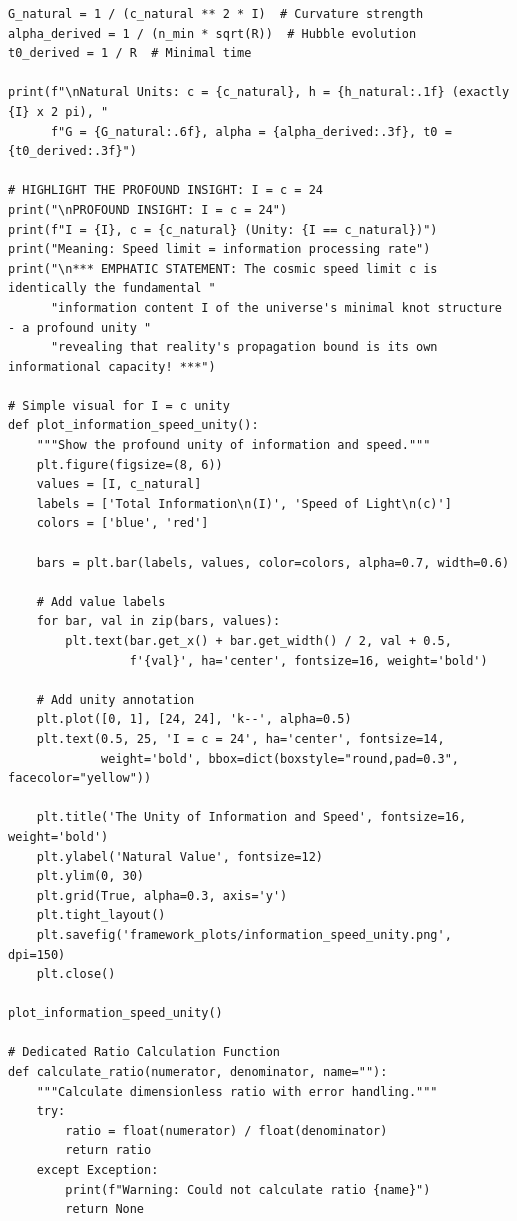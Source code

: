 \documentclass{article}
\begin{document}
\begin{verbatim}
G_natural = 1 / (c_natural ** 2 * I)  # Curvature strength
alpha_derived = 1 / (n_min * sqrt(R))  # Hubble evolution
t0_derived = 1 / R  # Minimal time

print(f"\nNatural Units: c = {c_natural}, h = {h_natural:.1f} (exactly {I} x 2 pi), "
      f"G = {G_natural:.6f}, alpha = {alpha_derived:.3f}, t0 = {t0_derived:.3f}")

# HIGHLIGHT THE PROFOUND INSIGHT: I = c = 24
print("\nPROFOUND INSIGHT: I = c = 24")
print(f"I = {I}, c = {c_natural} (Unity: {I == c_natural})")
print("Meaning: Speed limit = information processing rate")
print("\n*** EMPHATIC STATEMENT: The cosmic speed limit c is identically the fundamental "
      "information content I of the universe's minimal knot structure - a profound unity "
      "revealing that reality's propagation bound is its own informational capacity! ***")

# Simple visual for I = c unity
def plot_information_speed_unity():
    """Show the profound unity of information and speed."""
    plt.figure(figsize=(8, 6))
    values = [I, c_natural]
    labels = ['Total Information\n(I)', 'Speed of Light\n(c)']
    colors = ['blue', 'red']
    
    bars = plt.bar(labels, values, color=colors, alpha=0.7, width=0.6)
    
    # Add value labels
    for bar, val in zip(bars, values):
        plt.text(bar.get_x() + bar.get_width() / 2, val + 0.5,
                 f'{val}', ha='center', fontsize=16, weight='bold')
    
    # Add unity annotation
    plt.plot([0, 1], [24, 24], 'k--', alpha=0.5)
    plt.text(0.5, 25, 'I = c = 24', ha='center', fontsize=14,
             weight='bold', bbox=dict(boxstyle="round,pad=0.3", facecolor="yellow"))
    
    plt.title('The Unity of Information and Speed', fontsize=16, weight='bold')
    plt.ylabel('Natural Value', fontsize=12)
    plt.ylim(0, 30)
    plt.grid(True, alpha=0.3, axis='y')
    plt.tight_layout()
    plt.savefig('framework_plots/information_speed_unity.png', dpi=150)
    plt.close()

plot_information_speed_unity()

# Dedicated Ratio Calculation Function
def calculate_ratio(numerator, denominator, name=""):
    """Calculate dimensionless ratio with error handling."""
    try:
        ratio = float(numerator) / float(denominator)
        return ratio
    except Exception:
        print(f"Warning: Could not calculate ratio {name}")
        return None


\end{verbatim}
\end{document}
